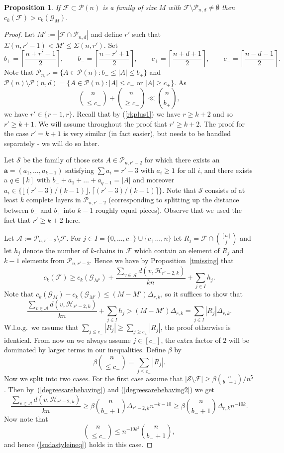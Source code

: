 \documentclass[12pt]{article}
\newtheorem{prop}[theorem]{Proposition}
\numberwithin{equation}{section}
\def\A{\mathcal{A}}
\def\F{\mathcal{F}}
\def\G{\mathcal{G}}
\def\HH{\mathcal{H}}
\def\P{\mathcal{P}}
\def\S{\mathcal{S}}
\begin{document}
\begin{prop}\label{doesntcontainsmalllargesets}
If $\F\subset \P(n)$ is a family of size $M$ with $\F\setminus \P_{n,d}\neq \emptyset$ then $c_k(\F)> c_k(\G_M)$.
\end{prop}
\begin{proof}
 Let $M':=|\F\cap \P_{n,d}|$ and define $r'$ such that $\Sigma(n,r'-1)<M'\leq \Sigma(n,r')$. Set $$b_+=\left\lceil\frac{n+r'-1}{2}\right\rceil, \qquad b_-=\left\lceil\frac{n-r'+1}{2}\right\rceil, \qquad  c_+=\left\lceil\frac{n+d+1}{2}\right\rceil,  \qquad c_-=\left\lceil\frac{n-d-1}{2}\right\rceil.$$ Note that $\P_{n,r'}=\{A\in\P(n):b_-\leq|A|\leq b_+\}$ and $\P(n)\setminus \P(n,d)=\{A\in\P(n):|A|\leq c_- \text{ or } |A|\geq c_+\}$. As 
$$\binom{n}{\leq c_-}+\binom{n}{\geq c_+} \ll \binom{n}{b_+},$$ we have $r'\in\{r-1,r\}$. Recall that by (\ref{rkplus1}) we have $r\geq k+2$ and so $r'\geq k+1$. We will assume throughout the proof that $r'\geq k+2$. The proof for the case $r'=k+1$ is very similar (in fact easier), but needs to be handled separately - we will do so later.

Let $\S$ be the family of those sets $A\in \P_{n,r'-2}$ for which there exists an $\mathbf{a}=(a_1,\ldots, a_{k-1})$ satisfying $\sum a_i = r'-3$ with $a_i\geq 1$ for all $i$, and there exists a $q\in [k]$ with $b_- + a_1 + \ldots + a_{q-1} = |A|$ and moreover $a_i\in\{\lfloor (r'-3)/(k-1)\rfloor,\lceil (r'-3)/(k-1)\rceil\}$. Note that $\S$ consists of at least $k$ complete layers in $\P_{n,r'-2}$ (corresponding to splitting up the distance between $b_-$ and $b_+$ into $k-1$ roughly equal pieces). Observe that we used the fact that $r'\geq k+2$ here.

 Let $\A:=\P_{n,r'-2}\setminus \F$. For $j\in I=\{0,\ldots,c_-\}\cup \{c_+\ldots,n\}$ let $R_j=\F\cap\binom{[n]}{j}$ and let $h_j$ denote the number of $k$-chains in $\F$ which contain an element of $R_j$ and $k-1$ elements from $\P_{n,r'-2}$.  Hence we have by Proposition~\ref{tmissing} that
$$c_k(\F)\geq c_k(\G_{M'})+\frac{\sum_{v\in \A}d(v,\HH_{r'-2,k})}{kn}+\sum_{j\in I} h_j.$$ Note that $c_k(\G_{M})-c_k(\G_{M'})\leq \left(M-M'\right)\Delta_{r,k}$, so it suffices to show that
\begin{equation}\label{sudastyleineq}\frac{\sum_{v\in \A}d(v,\HH_{r'-2,k})}{kn}+\sum_{j\in I}h_j>(M-M')\Delta_{r,k}=\sum_{j\in I}|R_j|\Delta_{r,k}.
\end{equation}
 W.l.o.g.~we assume that $\sum_{j\leq c_-}|R_j|\geq \sum_{j\geq c_+}|R_j|$, the proof otherwise is identical. From now on we always assume $j\in [c_-]$, the extra factor of $2$ will be dominated by larger terms in our inequalities. Define $\beta$ by
$$\beta \binom{n}{\leq c_-}=\sum_{j\leq c_-}|R_j|.$$
Now we split into two cases. For the first case assume that $|\S\setminus \F|\geq \beta\binom{n}{b_-+1}/n^5$. Then by~(\ref{degreesarebehaving}) and (\ref{degreesarebehaving2}) we get
$$\frac{\sum_{v\in \A}d(v,\HH_{r'-2,k})}{kn}\geq \beta\binom{n}{b_-+1}    \Delta_{r'-2,k}  n^{-k-10}\geq \beta\binom{n}{b_-+1}\Delta_{r,k}n^{-10k}.$$
Now note that
$$\binom{n}{\leq c_-}\leq n^{-10k^2}\binom{n}{b_-+1},$$ 
and hence (\ref{sudastyleineq}) holds in this case. 


\end{proof}
\end{document}
